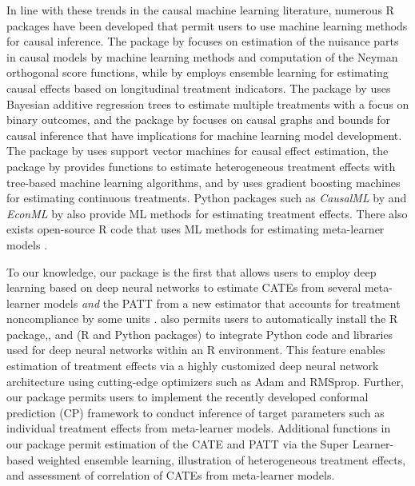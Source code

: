 In line with these trends in the causal machine learning literature,
numerous R packages have been developed that permit users to use machine
learning methods for causal inference. The package by 
\citet{bachDoubleML} focuses on estimation of the nuisance parts in causal
models by machine learning methods and computation of the Neyman
orthogonal score functions, while  by \citet{diaz2021} employs
ensemble learning for estimating causal effects based on longitudinal
treatment indicators. The  package by \citet{Hu2022} uses
Bayesian additive regression trees to estimate multiple treatments with
a focus on binary outcomes, and the package by 
\citet{Jonzon2023} focuses on causal graphs and bounds for causal inference
that have implications for machine learning model development. The
 package by \citet{SVMMatch} uses support vector machines for
causal effect estimation, the  package by \citet{htetree}
provides functions to estimate heterogeneous treatment effects with
tree-based machine learning algorithms, and  by
\citet{twangContinuous} uses gradient boosting machines for estimating
continuous treatments. Python packages such as \emph{CausalML} by
\citet{zhao2023causalML} and \emph{EconML} by \citet{econml} also provide ML methods for
estimating treatment effects. There also exists open-source R code that
uses ML methods for estimating meta-learner models \citep{Kunzel2019meta, nie2021quasi}.

To our knowledge, our  package is the first that
allows users to employ deep learning based on deep neural networks to
estimate CATEs from several meta-learner models \emph{and} the PATT from a
new estimator that accounts for treatment noncompliance by some units
\citep{ottoboni2020PATT}.  also permits users to
automatically install the  R package,,
and  (R and Python packages) to integrate Python code and
libraries used for deep neural networks within an R environment. This
feature enables estimation of treatment effects via a highly customized
deep neural network architecture using cutting-edge optimizers such as
Adam and RMSprop. Further, our package permits users to implement the
recently developed conformal prediction (CP) framework to conduct
inference of target parameters such as individual treatment effects from
meta-learner models. Additional functions in our package permit
estimation of the CATE and PATT via the Super Learner-based weighted
ensemble learning, illustration of heterogeneous treatment effects, and
assessment of correlation of CATEs from meta-learner models.

